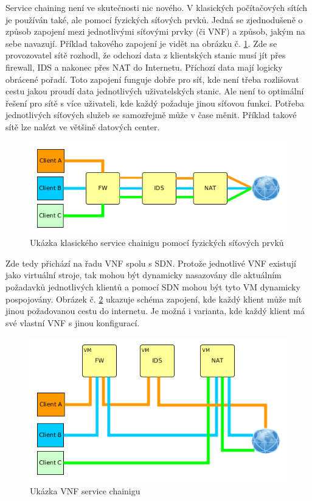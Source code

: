 Service chaining není ve skutečnosti nic nového. V klasických počítačových sítích je používán také, ale pomocí fyzických síťových prvků. Jedná se zjednodušeně o způsob zapojení mezi jednotlivými síťovými prvky (či VNF) a způsob, jakým na sebe navazují. Příklad takového zapojení je vidět na obrázku č. \ref{fig:service_chaining}. Zde se provozovatel sítě rozhodl, že odchozí data z klientských stanic musí jít přes firewall, IDS a nakonec přes NAT do Internetu. Příchozí data mají logicky obrácené pořadí. Toto zapojení funguje dobře pro síť, kde není třeba rozlišovat cestu jakou proudí data jednotlivých uživatelských stanic. Ale není to optimální řešení pro sítě s více uživateli, kde každý požaduje jinou síťovou funkci. Potřeba jednotlivých síťových služeb se samozřejmě může v čase měnit. Příklad takové sítě lze nalézt ve většině datových center. 

\begin{figure}[h]
\begin{centering}
\includegraphics[scale=0.55]{images/service_chaining}
\par\end{centering}
\caption{Ukázka klasického service chainigu pomocí fyzických síťových prvků\label{fig:service_chaining}}
\end{figure}

Zde tedy přichází na řadu VNF spolu s SDN. Protože jednotlivé VNF existují jako virtuální stroje, tak mohou být dynamicky nasazovány dle aktuálním požadavků jednotlivých klientů a pomocí SDN mohou být tyto VM dynamicky pospojovány. Obrázek č. \ref{fig:service_chaining_new} ukazuje schéma zapojení, kde každý klient může mít jinou požadovanou cestu do internetu. Je možná i varianta, kde každý klient má své vlastní VNF s jinou konfigurací.

\begin{figure}[h]
\begin{centering}
\includegraphics[scale=0.55]{images/service_chaining_new}
\par\end{centering}
\caption{Ukázka VNF service chainigu\label{fig:service_chaining_new}}
\end{figure}